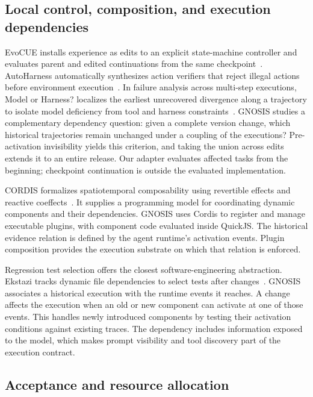 \documentclass{ecai}
\begin{document}
\subsection{Local control, composition, and execution dependencies}

EvoCUE installs experience as edits to an explicit state-machine controller and evaluates parent and edited continuations from the same checkpoint~\cite{evocue}. AutoHarness automatically synthesizes action verifiers that reject illegal actions before environment execution~\cite{autoharness}. In failure analysis across multi-step executions, Model or Harness? localizes the earliest unrecovered divergence along a trajectory to isolate model deficiency from tool and harness constraints~\cite{modelorharness}. GNOSIS studies a complementary dependency question: given a complete version change, which historical trajectories remain unchanged under a coupling of the executions? Pre-activation invisibility yields this criterion, and taking the union across edits extends it to an entire release. Our adapter evaluates affected tasks from the beginning; checkpoint continuation is outside the evaluated implementation.

CORDIS formalizes spatiotemporal composability using revertible effects and reactive coeffects~\cite{cordis}. It supplies a programming model for coordinating dynamic components and their dependencies. GNOSIS uses Cordis to register and manage executable plugins, with component code evaluated inside QuickJS. The historical evidence relation is defined by the agent runtime's activation events. Plugin composition provides the execution substrate on which that relation is enforced.

Regression test selection offers the closest software-engineering abstraction. Ekstazi tracks dynamic file dependencies to select tests after changes~\cite{ekstazi}. GNOSIS associates a historical execution with the runtime events it reaches. A change affects the execution when an old or new component can activate at one of those events. This handles newly introduced components by testing their activation conditions against existing traces. The dependency includes information exposed to the model, which makes prompt visibility and tool discovery part of the execution contract.

\subsection{Acceptance and resource allocation}
\end{document}
